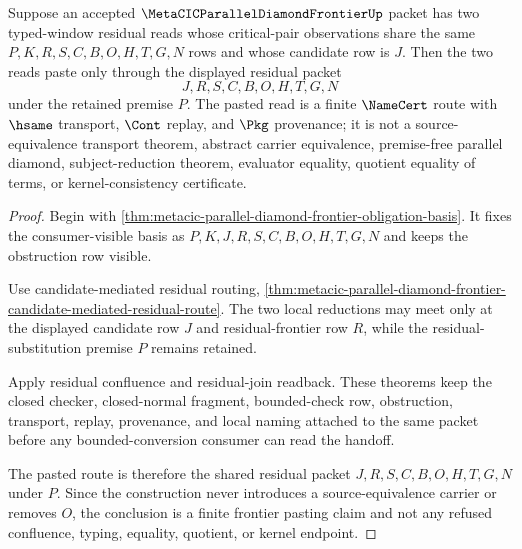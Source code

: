 \begin{theorem}
\label{thm:metacic-parallel-diamond-frontier-residual-pasting}
Suppose an accepted $\MetaCICParallelDiamondFrontierUp$ packet has two typed-window residual reads whose critical-pair observations share the same $P,K,R,S,C,B,O,H,T,G,N$ rows and whose candidate row is $J$. Then the two reads paste only through the displayed residual packet
$$
J,R,S,C,B,O,H,T,G,N
$$
under the retained premise $P$. The pasted read is a finite $\NameCert$ route with $\hsame$ transport, $\Cont$ replay, and $\Pkg$ provenance; it is not a source-equivalence transport theorem, abstract carrier equivalence, premise-free parallel diamond, subject-reduction theorem, evaluator equality, quotient equality of terms, or kernel-consistency certificate.
\end{theorem}
\begin{proof}
Begin with \autoref{thm:metacic-parallel-diamond-frontier-obligation-basis}. It fixes the consumer-visible basis as $P,K,J,R,S,C,B,O,H,T,G,N$ and keeps the obstruction row visible.

Use candidate-mediated residual routing, \autoref{thm:metacic-parallel-diamond-frontier-candidate-mediated-residual-route}. The two local reductions may meet only at the displayed candidate row $J$ and residual-frontier row $R$, while the residual-substitution premise $P$ remains retained.

Apply residual confluence and residual-join readback. These theorems keep the closed checker, closed-normal fragment, bounded-check row, obstruction, transport, replay, provenance, and local naming attached to the same packet before any bounded-conversion consumer can read the handoff.

The pasted route is therefore the shared residual packet $J,R,S,C,B,O,H,T,G,N$ under $P$. Since the construction never introduces a source-equivalence carrier or removes $O$, the conclusion is a finite frontier pasting claim and not any refused confluence, typing, equality, quotient, or kernel endpoint.
\end{proof}

